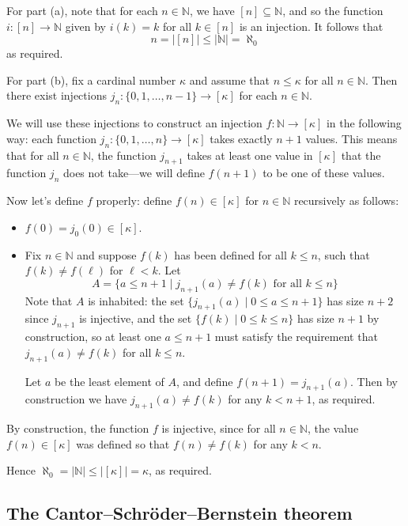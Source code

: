 \begin{cproof}
For part (a), note that for each $n \in \mathbb{N}$, we have $[n] \subseteq \mathbb{N}$, and so the function $i : [n] \to \mathbb{N}$ given by $i(k) = k$ for all $k \in [n]$ is an injection. It follows that
\[ n = |[n]| \le |\mathbb{N}| = \aleph_0 \]
as required.

For part (b), fix a cardinal number $\kappa$ and assume that $n \le \kappa$ for all $n \in \mathbb{N}$. Then there exist injections $j_n : \{0, 1, \dots, n-1 \} \to [\kappa]$ for each $n \in \mathbb{N}$.

We will use these injections to construct an injection $f : \mathbb{N} \to [\kappa]$ in the following way: each function $j_n : \{ 0,1,\dots,n \} \to [\kappa]$ takes exactly $n+1$ values. This means that for all $n \in \mathbb{N}$, the function $j_{n+1}$ takes at least one value in $[\kappa]$ that the function $j_n$ does not take---we will define $f(n+1)$ to be one of these values.

Now let's define $f$ properly: define $f(n) \in [\kappa]$ for $n \in \mathbb{N}$ recursively as follows:
\begin{itemize}
\item $f(0) = j_0(0) \in [\kappa]$.
\item Fix $n \in \mathbb{N}$ and suppose $f(k)$ has been defined for all $k \le n$, such that $f(k) \ne f(\ell)$ for $\ell < k$. Let
\[ A = \{ a \le n+1 \mid j_{n+1}(a) \ne f(k) \text{ for all } k \le n \} \]
Note that $A$ is inhabited: the set $\{ j_{n+1}(a) \mid 0 \le a \le n+1 \}$ has size $n+2$ since $j_{n+1}$ is injective, and the set $\{ f(k) \mid 0 \le k \le n \}$ has size $n+1$ by construction, so at least one $a \le n+1$ must satisfy the requirement that $j_{n+1}(a) \ne f(k)$ for all $k \le n$.

Let $a$ be the least element of $A$, and define $f(n+1) = j_{n+1}(a)$. Then by construction we have $j_{n+1}(a) \ne f(k)$ for any $k < n+1$, as required.
\end{itemize}

By construction, the function $f$ is injective, since for all $n \in \mathbb{N}$, the value $f(n) \in [\kappa]$ was defined so that $f(n) \ne f(k)$ for any $k < n$.

Hence $\aleph_0 = |\mathbb{N}| \le |[\kappa]| = \kappa$, as required.
\end{cproof}

\subsection*{The Cantor--Schr\"{o}der--Bernstein theorem}

